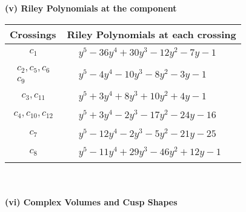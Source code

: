 \documentclass[1p]{elsarticle_modified}
\theoremstyle{definition}
\begin{document}
\newpage\renewcommand{\arraystretch}{1}
\flushleft \textbf{(v) Riley Polynomials at the component}\newline \\
\begin{tabular}{m{50pt}|m{274pt}}
Crossings & \hspace{64pt}Riley Polynomials at each crossing \\
\hline $$\begin{aligned}c_{1}\end{aligned}$$&$\begin{aligned}
&y^5-36 y^4+30 y^3-12 y^2-7 y-1
\end{aligned}$\\
\hline $$\begin{aligned}c_{2},c_{5},c_{6}\\c_{9}\end{aligned}$$&$\begin{aligned}
&y^5-4 y^4-10 y^3-8 y^2-3 y-1
\end{aligned}$\\
\hline $$\begin{aligned}c_{3},c_{11}\end{aligned}$$&$\begin{aligned}
&y^5+3 y^4+8 y^3+10 y^2+4 y-1
\end{aligned}$\\
\hline $$\begin{aligned}c_{4},c_{10},c_{12}\end{aligned}$$&$\begin{aligned}
&y^5+3 y^4-2 y^3-17 y^2-24 y-16
\end{aligned}$\\
\hline $$\begin{aligned}c_{7}\end{aligned}$$&$\begin{aligned}
&y^5-12 y^4-2 y^3-5 y^2-21 y-25
\end{aligned}$\\
\hline $$\begin{aligned}c_{8}\end{aligned}$$&$\begin{aligned}
&y^5-11 y^4+29 y^3-46 y^2+12 y-1
\end{aligned}$\\
\hline
\end{tabular}\\~\\
\newpage\flushleft \textbf{(vi) Complex Volumes and Cusp Shapes}
\end{document}
